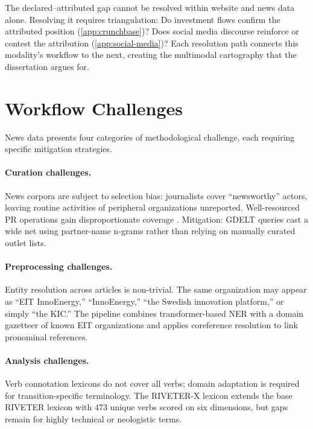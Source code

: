 \documentclass[../main.tex]{subfiles}
\begin{document}
\begin{criticalbox}
The declared--attributed gap cannot be resolved within
website and news data alone.
Resolving it requires triangulation:
Do investment flows confirm the attributed position (\cref{app:crunchbase})?
Does social media discourse reinforce or contest the attribution
(\cref{app:social-media})?
Each resolution path connects this modality's workflow to the next,
creating the multimodal cartography that the dissertation argues for.
\end{criticalbox}


\section{Workflow Challenges}
\label{sec:news-challenges}

News data presents four categories of methodological challenge,
each requiring specific mitigation strategies.

\paragraph{Curation challenges.}
News corpora are subject to selection bias:
journalists cover ``newsworthy'' actors, leaving routine
activities of peripheral organizations unreported.
Well-resourced PR operations gain disproportionate coverage
\parencite{hager2024media}.
Mitigation: GDELT queries cast a wide net using partner-name
n-grams rather than relying on manually curated outlet lists.

\paragraph{Preprocessing challenges.}
Entity resolution across articles is non-trivial.
The same organization may appear as ``EIT InnoEnergy,''
``InnoEnergy,'' ``the Swedish innovation platform,'' or simply
``the KIC.''
The pipeline combines transformer-based NER with a domain
gazetteer of known EIT organizations and applies coreference
resolution to link pronominal references.

\paragraph{Analysis challenges.}
Verb connotation lexicons do not cover all verbs;
domain adaptation is required for transition-specific
terminology.
The RIVETER-X lexicon extends the base RIVETER lexicon
with 473 unique verbs scored on six dimensions, but gaps
remain for highly technical or neologistic terms.
\end{document}
